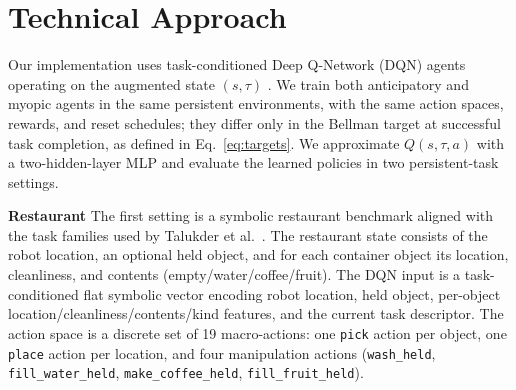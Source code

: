 \documentclass{article}
\begin{document}

\section{Technical Approach}
Our implementation uses task-conditioned Deep Q-Network (DQN) agents operating on the augmented state $(s,\tau)$ \cite{mnih2015dqn}. We train both anticipatory and myopic agents in the same persistent environments, with the same action spaces, rewards, and reset schedules; they differ only in the Bellman target at successful task completion, as defined in Eq.~\eqref{eq:targets}. We approximate $Q(s,\tau,a)$ with a two-hidden-layer MLP and evaluate the learned policies in two persistent-task settings.

\noindent\textbf{Restaurant}
The first setting is a symbolic restaurant benchmark aligned with the task families used by Talukder et al.\ \cite{talukder2024large}. The restaurant state consists of the robot location, an optional held object, and for each container object its location, cleanliness, and contents (empty/water/coffee/fruit). The DQN input is a task-conditioned flat symbolic vector encoding robot location, held object, per-object location/cleanliness/contents/kind features, and the current task descriptor. The action space is a discrete set of 19 macro-actions: one \texttt{pick} action per object, one \texttt{place} action per location, and four manipulation actions (\texttt{wash\_held}, \texttt{fill\_water\_held}, \texttt{make\_coffee\_held}, \texttt{fill\_fruit\_held}).
\end{document}
